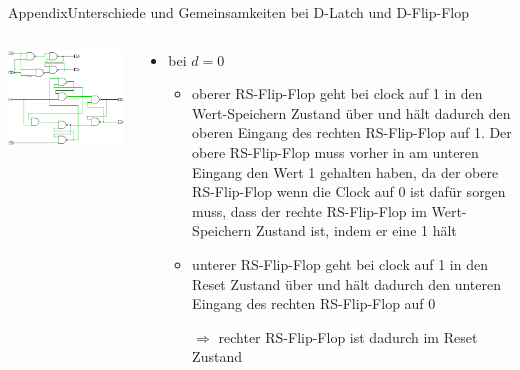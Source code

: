 \begin{frame}{Appendix}{Unterschiede und Gemeinsamkeiten bei D-Latch und D-Flip-Flop}
  \begin{columns}
    \begin{column}{0.4\textwidth}
      \includegraphics[width=0.6\paperheight, center]{./figures/100.png}
    \end{column}
    \begin{column}{0.6\textwidth}
      \begin{itemize}
        \item bei $d=0$
        \begin{itemize}
          \item \alert{oberer RS-Flip-Flop} geht bei \alert{clock} auf \alert{1} in den \alert{Wert-Speichern Zustand} über und hält dadurch den oberen Eingang des \alert{rechten RS-Flip-Flop} auf \alert{1}. Der \alert{obere RS-Flip-Flop} muss vorher in am unteren Eingang den Wert \alert{1} gehalten haben, da der obere RS-Flip-Flop wenn die Clock auf \alert{0} ist dafür sorgen muss, dass der \alert{rechte RS-Flip-Flop} im \alert{Wert-Speichern Zustand} ist, indem er eine \alert{1} hält
          
          \item \alert{unterer RS-Flip-Flop} geht bei \alert{clock} auf \alert{1} in den \alert{Reset Zustand} über und hält dadurch den unteren Eingang des \alert{rechten RS-Flip-Flop} auf \alert{0}
          \item[\textcolor{PrimaryColor}{$\Rightarrow$}] \alert{rechter RS-Flip-Flop} ist dadurch im \alert{Reset Zustand}
        \end{itemize}
      \end{itemize}
    \end{column}
  \end{columns}
\end{frame}
